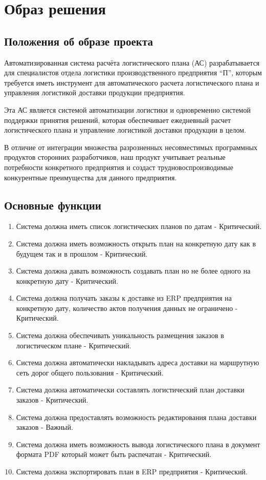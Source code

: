 \chapter{Образ решения}
\label{ch:chap2}


\section{Положения об образе проекта}
\label{sec:vision}

Автоматизированная система расчёта логистического плана (АС) разрабатывается для специалистов отдела логистики производственного предприятия ``П'',
которым требуется иметь инструмент для автоматического расчета логистического плана и управления логистикой доставки продукции предприятия.

Эта АС является системой автоматизации логистики и одновременно системой поддержки принятия решений,
которая обеспечивает ежедневный расчет логистического плана и управление логистикой доставки продукции в целом.

В отличие от интеграции множества разрозненных несовместимых программных продуктов сторонних разработчиков,
наш продукт учитывает реальные потребности конкретного предприятия и создаст трудновоспроизводимые конкурентные преимущества для данного предприятия.


\section{Основные функции}
\label{sec:fun}

\begin{enumerate}[label=FUN-\arabic*]
    \item Система должна иметь список логистических планов по датам - Критический.
    \item Система должна иметь возможность открыть план на конкретную дату как в будущем так и в прошлом - Критический.
    \item Система должна давать возможность создавать план но не более одного на конкретную дату - Критический.
    \item Система должна получать заказы к доставке из ERP предприятия на конкретную дату, количество актов получения данных не ограничено - Критический.
    \item Система должна обеспечивать уникальность размещения заказов в логистическом плане - Критический.
    \item Система должна автоматически накладывать адреса доставки на маршрутную сеть дорог общего пользования - Критический.
    \item Система должна автоматически составлять логистический план доставки заказов - Критический.
    \item Система должна предоставлять возможность редактирования плана доставки заказов - Важный.
    \item Система должна иметь возможность вывода логистического плана в документ формата PDF который может быть распечатан - Критический.
    \item Система должна экспортировать план в ERP предприятия - Критический.
\end{enumerate}

